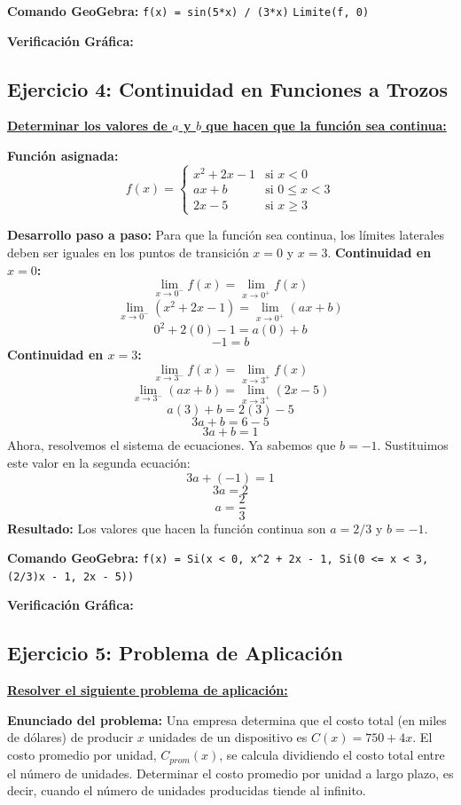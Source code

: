 \documentclass{article}
\begin{document}
\textbf{Comando GeoGebra:}
\texttt{f(x) = sin(5*x) / (3*x)}
\texttt{Limite(f, 0)}

\textbf{Verificación Gráfica:}

\newpage

\subsection*{Ejercicio 4: Continuidad en Funciones a Trozos}
\underline{\textbf{Determinar los valores de $a$ y $b$ que hacen que la función sea continua:}}

\textbf{Función asignada:}
\[ f(x) = \begin{cases} x^2 + 2x - 1 & \text{si } x < 0 \\ ax + b & \text{si } 0 \le x < 3 \\ 2x - 5 & \text{si } x \ge 3 \end{cases} \]

\textbf{Desarrollo paso a paso:}
Para que la función sea continua, los límites laterales deben ser iguales en los puntos de transición $x=0$ y $x=3$.
\textbf{Continuidad en $x=0$:}
\[ \lim_{x \to 0^-} f(x) = \lim_{x \to 0^+} f(x) \]
\[ \lim_{x \to 0^-} (x^2 + 2x - 1) = \lim_{x \to 0^+} (ax + b) \]
\[ 0^2 + 2(0) - 1 = a(0) + b \]
\[ -1 = b \]
\textbf{Continuidad en $x=3$:}
\[ \lim_{x \to 3^-} f(x) = \lim_{x \to 3^+} f(x) \]
\[ \lim_{x \to 3^-} (ax + b) = \lim_{x \to 3^+} (2x - 5) \]
\[ a(3) + b = 2(3) - 5 \]
\[ 3a + b = 6 - 5 \]
\[ 3a + b = 1 \]
Ahora, resolvemos el sistema de ecuaciones. Ya sabemos que $b=-1$. Sustituimos este valor en la segunda ecuación:
\[ 3a + (-1) = 1 \]
\[ 3a = 2 \]
\[ a = \frac{2}{3} \]
\textbf{Resultado:} Los valores que hacen la función continua son $a = 2/3$ y $b = -1$.

\textbf{Comando GeoGebra:}
\texttt{f(x) = Si(x < 0, x\textasciicircum 2 + 2x - 1, Si(0 <= x < 3, (2/3)x - 1, 2x - 5))}

\textbf{Verificación Gráfica:}

\newpage

\subsection*{Ejercicio 5: Problema de Aplicación}
\underline{\textbf{Resolver el siguiente problema de aplicación:}}

\textbf{Enunciado del problema:}
Una empresa determina que el costo total (en miles de dólares) de producir $x$ unidades de un dispositivo es $C(x) = 750 + 4x$. El costo promedio por unidad, $C_{prom}(x)$, se calcula dividiendo el costo total entre el número de unidades. Determinar el costo promedio por unidad a largo plazo, es decir, cuando el número de unidades producidas tiende al infinito.
\end{document}
